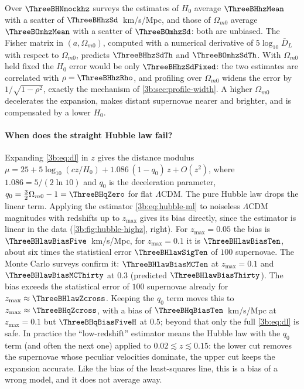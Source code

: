 Over $\ThreeBHNmockhz$ surveys the estimates of $H_0$ average
$\ThreeBHhzMean$ with a scatter of $\ThreeBHhzSd$~km/s/Mpc, and those of
$\Omega_{m0}$ average $\ThreeBOmhzMean$ with a scatter of $\ThreeBOmhzSd$: both
are unbiased. The Fisher matrix in $(a,\Omega_{m0})$, computed with a
numerical derivative of $5\log_{10}\bar D_L$ with respect to $\Omega_{m0}$,
predicts $\ThreeBHhzSdTh$ and $\ThreeBOmhzSdTh$. With $\Omega_{m0}$ held fixed
the $H_0$ error would be only $\ThreeBHhzSdFixed$: the two estimates are
correlated with $\rho=\ThreeBHhzRho$, and profiling over $\Omega_{m0}$ widens
the error by $1/\sqrt{1-\rho^2}$, exactly the mechanism of
\cref{3b:sec:profile-width}. A higher $\Omega_{m0}$ decelerates the expansion,
makes distant supernovae nearer and brighter, and is compensated by a lower $H_0$.

\paragraph{When does the straight Hubble law fail?}
Expanding \eqref{3b:eq:dl} in $z$ gives the distance modulus
$\mu=25+5\log_{10}(cz/H_0)+1.086\,(1-q_0)\,z+O(z^2)$, where
$1.086=5/(2\ln10)$ and $q_0$ is the deceleration parameter, $q_0=\tfrac32\Omega_{m0}-1=\ThreeBHqZero$
for flat $\Lambda$CDM. The pure Hubble law drops the linear term. Applying
the estimator \eqref{3b:eq:hubble-ml} to noiseless $\Lambda$CDM magnitudes
with redshifts up to $z_{\max}$ gives its bias directly, since the estimator
is linear in the data (\cref{3b:fig:hubble-highz}, right). For $z_{\max}=0.05$ the bias is
$\ThreeBHlawBiasFive$~km/s/Mpc, for $z_{\max}=0.1$ it is $\ThreeBHlawBiasTen$,
about six times the statistical error $\ThreeBHlawSigTen$ of $100$
supernovae. The Monte Carlo surveys confirm it: $\ThreeBHlawBiasMCTen$ at
$z_{\max}=0.1$ and $\ThreeBHlawBiasMCThirty$ at $0.3$ (predicted
$\ThreeBHlawBiasThirty$). The bias exceeds the statistical error of $100$
supernovae already for $z_{\max}\approx\ThreeBHlawZcross$. Keeping the $q_0$ term
moves this to $z_{\max}\approx\ThreeBHqZcross$, with a bias of
$\ThreeBHqBiasTen$~km/s/Mpc at $z_{\max}=0.1$ but $\ThreeBHqBiasFiveH$ at $0.5$; beyond that
only the full \eqref{3b:eq:dl} is safe. In practice the ``low-redshift''
estimator means the Hubble law with the $q_0$ term (and often the next one)
applied to $0.02\lesssim z\lesssim0.15$: the lower cut removes the supernovae
whose peculiar velocities dominate, the upper cut keeps the expansion
accurate. Like the bias of the least-squares line, this is a bias of a wrong
model, and it does not average away.

